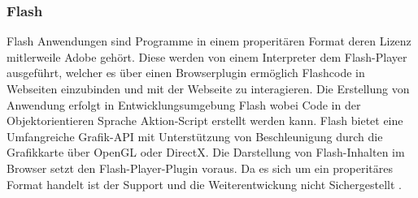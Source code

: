 \subsubsection{Flash}
\label{sec:Flash}
Flash Anwendungen sind Programme in einem properitären Format deren Lizenz mitlerweile Adobe gehört.
Diese werden von einem Interpreter dem Flash-Player ausgeführt, welcher es über einen Browserplugin ermöglich Flashcode in Webseiten einzubinden und mit der Webseite zu interagieren.
%
Die Erstellung von Anwendung erfolgt in Entwicklungsumgebung Flash wobei Code in der Objektorientieren Sprache Aktion-Script erstellt werden kann.
Flash bietet eine Umfangreiche Grafik-API mit Unterstützung von Beschleunigung durch die Grafikkarte über OpenGL oder DirectX.
%
Die Darstellung von Flash-Inhalten im Browser setzt den Flash-Player-Plugin voraus.
Da es sich um ein properitäres Format handelt ist der Support und die Weiterentwickung nicht Sichergestellt \cite{flash-14}.
